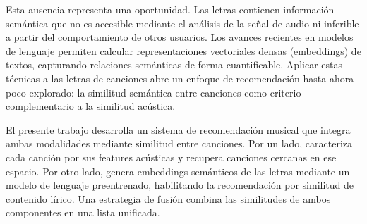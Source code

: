 Esta ausencia representa una oportunidad. Las letras contienen información semántica que no es accesible mediante el análisis de la señal de audio ni inferible a partir del comportamiento de otros usuarios. Los avances recientes en modelos de lenguaje permiten calcular representaciones vectoriales densas (embeddings) de textos, capturando relaciones semánticas de forma cuantificable. Aplicar estas técnicas a las letras de canciones abre un enfoque de recomendación hasta ahora poco explorado: la similitud semántica entre canciones como criterio complementario a la similitud acústica.

El presente trabajo desarrolla un sistema de recomendación musical que integra ambas modalidades mediante similitud entre canciones. Por un lado, caracteriza cada canción por sus features acústicas y recupera canciones cercanas en ese espacio. Por otro lado, genera embeddings semánticos de las letras mediante un modelo de lenguaje preentrenado, habilitando la recomendación por similitud de contenido lírico. Una estrategia de fusión combina las similitudes de ambos componentes en una lista unificada.

